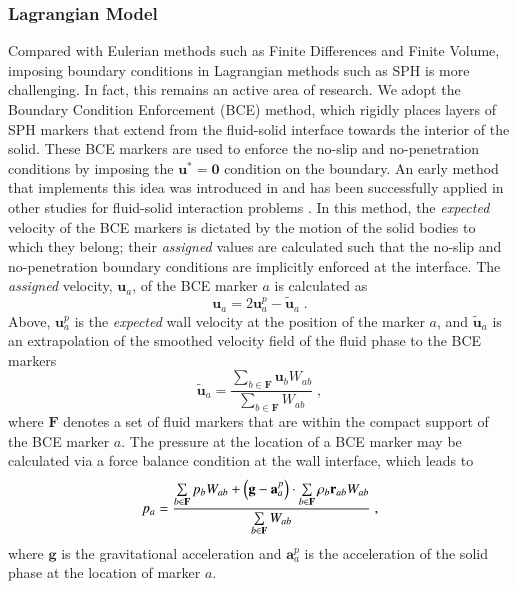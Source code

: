 \documentclass[final,3p,times]{elsarticle}
\begin{document}
\subsubsection{Lagrangian Model}
\label{subsec:BC-LagModel}
Compared with Eulerian methods such as Finite Differences and Finite Volume, imposing boundary conditions in Lagrangian methods such as SPH is more challenging. In fact, this remains  an active area of research. We adopt the Boundary Condition Enforcement (BCE) method, which rigidly places layers of SPH markers that extend from the fluid-solid interface towards the interior of the solid. These BCE markers are used to enforce the no-slip and no-penetration conditions by imposing the $\mathbf{u}^*= \mathbf{0}$ condition on the boundary. An early method that implements this idea was introduced in \cite{Adami2012} and has been successfully applied in other studies for fluid-solid interaction problems \cite{miladHalfImplicit2018,armanCompFluids2015}. In this method, the \textit{expected} velocity of the BCE markers is dictated by the motion of the solid bodies to which they belong; their \textit{assigned} values are calculated such that the no-slip and no-penetration boundary conditions are implicitly enforced at the interface. The \textit{assigned} velocity, $\mathbf{u}_a$, of the BCE marker $a$ is calculated as \cite{Adami2012}
\begin{equation} \label{eq:vBCE_Adami}
\mathbf{u}_a = 2 \mathbf{u}^{p}_a - \tilde{\mathbf{u}}_a \; .
\end{equation}
Above, $\mathbf{u}^{p}_a$ is the \textit{expected} wall velocity at the position of the marker $a$, and $\tilde{\mathbf{u}}_a$ is an extrapolation of the smoothed velocity field of the fluid phase to the BCE markers
\begin{equation}\label{eq:BCE_extrapolation}
\tilde{\mathbf{u}}_a = \frac{\sum\limits_{b \in \mathbf{F}} {\mathbf{u}_b W_{ab}}}{\sum\limits_{b \in \mathbf{F}} {W_{ab}}} \; ,
\end{equation}
where $\mathbf{F}$ denotes a set of fluid markers that are within the compact support of the BCE marker $a$. The pressure at the location of a BCE marker may be calculated via a force balance condition at the wall interface, which leads to \cite{Adami2012}
\begin{equation} \label{eq:pBCE_Adami}
p_a = \frac{\sum\limits_{b \in \bf F} {p_b W_{ab}} + \left( \mathbf{g} - \mathbf{a}_a^p \right) \cdot \sum\limits_{b \in \bf F} {\rho_b \mathbf{r}_{ab} W_{ab} }}{\sum\limits_{b \in \bf F} {W_{ab}}} \; ,
\end{equation}
where $\mathbf{g}$ is the gravitational acceleration and $\mathbf{a}_a^p$ is the acceleration of the solid phase at the location of  marker $a$.
\end{document}
